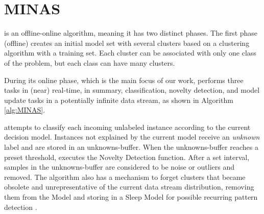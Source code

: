 \section{MINAS}
\label{sec:minas}


\minas \cite{Faria2013Minas,Faria2016minas} is an offline-online \nd algorithm,
meaning it has two distinct phases. The first phase (offline) creates an initial
model set with several clusters based on a clustering algorithm with a training
set.
Each cluster can be associated with only one class of the problem, but each
class can have many clusters.

During its online phase, which is the main focus of our work, \minas performs
three tasks in (near) real-time,
in summary,
classification, novelty detection, and model update tasks
in a potentially infinite data stream, as shown in Algorithm \ref{alg:MINAS}.

\minas attempts to classify each incoming unlabeled instance according to the
current decision model. Instances not explained by the current model
receive an \textit{unknown} label and are stored in an unknowns-buffer.
When the unknowns-buffer reaches a preset threshold, \minas executes the
Novelty Detection function.
After a set interval, samples in the unknowns-buffer are considered to be
noise or outliers and removed.
The algorithm also has a mechanism to forget clusters that became obsolete and
unrepresentative of the current data stream distribution, removing them from
the Model and storing in a Sleep Model for possible recurring pattern
detection \cite{Faria2016minas}.

